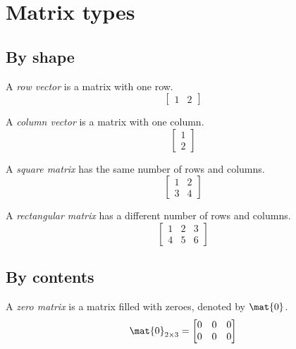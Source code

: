 \section{Matrix types}

\subsection{By shape}

A \textit{row vector} is a matrix with one row.
\begin{equation*}
  \begin{bmatrix}
    1 & 2
  \end{bmatrix}
\end{equation*}

A \textit{column vector} is a matrix with one column.
\begin{equation*}
  \begin{bmatrix}
    1 \\
    2
  \end{bmatrix}
\end{equation*}

A \textit{square matrix} has the same number of rows and columns.
\begin{equation*}
  \begin{bmatrix}
    1 & 2 \\
    3 & 4
  \end{bmatrix}
\end{equation*}

A \textit{rectangular matrix} has a different number of rows and columns.
\begin{equation*}
  \begin{bmatrix}
    1 & 2 & 3 \\
    4 & 5 & 6
  \end{bmatrix}
\end{equation*}

\subsection{By contents}

A \textit{zero matrix} is a matrix filled with zeroes, denoted by $\mat{0}$.
\begin{equation*}
  \mat{0}_{2 \times 3} =
  \begin{bmatrix}
    0 & 0 & 0 \\
    0 & 0 & 0
  \end{bmatrix}
\end{equation*}

